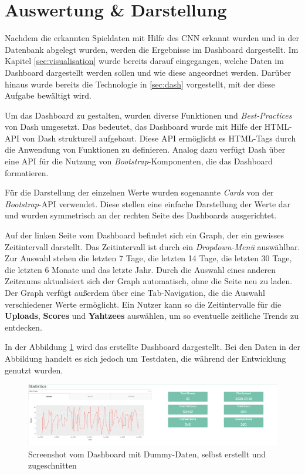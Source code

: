 \section{Auswertung \& Darstellung} \label{sec:dashboard}
Nachdem die erkannten Spieldaten mit Hilfe des CNN erkannt wurden und in der Datenbank abgelegt wurden, werden die Ergebnisse im Dashboard dargestellt. Im Kapitel \ref{sec:visualisation} wurde bereits darauf eingegangen, welche Daten im Dashboard dargestellt werden sollen und wie diese angeordnet werden. Darüber hinaus wurde bereits die Technologie in \ref{sec:dash} vorgestellt, mit der diese Aufgabe bewältigt wird.

Um das Dashboard zu gestalten, wurden diverse Funktionen und \textit{Best-Practices} von Dash umgesetzt. Das bedeutet, das Dashboard wurde mit Hilfe der HTML-API von Dash strukturell aufgebaut. Diese API ermöglicht es HTML-Tags durch die Anwendung von Funktionen zu definieren. Analog dazu verfügt Dash über eine API für die Nutzung von \textit{Bootstrap}-Komponenten, die das Dashboard formatieren. \cite{plotly}

Für die Darstellung der einzelnen Werte wurden sogenannte \textit{Cards} von der \textit{Bootstrap}-API verwendet. Diese stellen eine einfache Darstellung der Werte dar und wurden symmetrisch an der rechten Seite des Dashboards ausgerichtet.

Auf der linken Seite vom Dashboard befindet sich ein Graph, der ein gewisses Zeitintervall darstellt. Das Zeitintervall ist durch ein \textit{Dropdown-Menü} auswählbar. Zur Auswahl stehen die letzten 7 Tage, die letzten 14 Tage, die letzten 30 Tage, die letzten 6 Monate und das letzte Jahr. Durch die Auswahl eines anderen Zeitraums aktualisiert sich der Graph automatisch, ohne die Seite neu zu laden.
Der Graph verfügt außerdem über eine Tab-Navigation, die die Auswahl verschiedener Werte ermöglicht. Ein Nutzer kann so die Zeitintervalle für die \textbf{Uploads}, \textbf{Scores} und \textbf{Yahtzees} auswählen, um so eventuelle zeitliche Trends zu entdecken.

In der Abbildung \ref{fig:dashboard} wird das erstellte Dashboard dargestellt. Bei den Daten in der Abbildung handelt es sich jedoch um Testdaten, die während der Entwicklung genutzt wurden.

\begin{figure}[H]
	\centering
	\includegraphics[width=\imgMed]{images/practice/screenshot_dashboard.png}
	\caption{Screenshot vom Dashboard mit Dummy-Daten, selbst erstellt und zugeschnitten}
	\label{fig:dashboard}
\end{figure}

